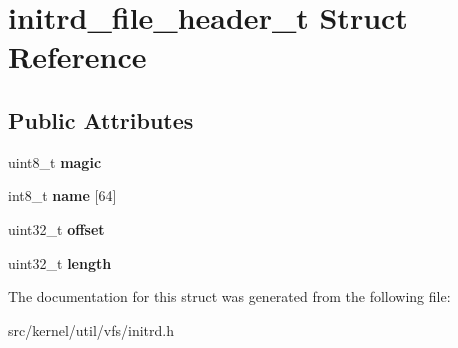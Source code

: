 \hypertarget{structinitrd__file__header__t}{}\section{initrd\+\_\+file\+\_\+header\+\_\+t Struct Reference}
\label{structinitrd__file__header__t}
\subsection*{Public Attributes}
\begin{DoxyCompactItemize}
\item 
\mbox{\label{structinitrd__file__header__t_a06c3939a6be00c79245f19f288a003a4}} 
uint8\+\_\+t {\bfseries magic}
\item 
\mbox{\label{structinitrd__file__header__t_a0cb9f3a36e92cd04a815d68cc51ee4f3}} 
int8\+\_\+t {\bfseries name} \mbox{[}64\mbox{]}
\item 
\mbox{\label{structinitrd__file__header__t_a334bf66c35f1c89ba936eb15c253b7ce}} 
uint32\+\_\+t {\bfseries offset}
\item 
\mbox{\label{structinitrd__file__header__t_a1f16ed56d44bb46a40fef6713c1a6ea2}} 
uint32\+\_\+t {\bfseries length}
\end{DoxyCompactItemize}


The documentation for this struct was generated from the following file\+:\begin{DoxyCompactItemize}
\item 
src/kernel/util/vfs/initrd.\+h\end{DoxyCompactItemize}
